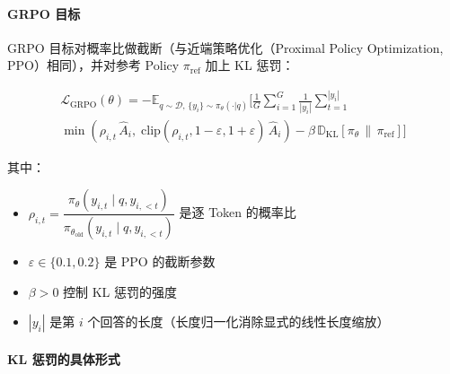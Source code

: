 \paragraph{GRPO 目标}
\label{grpo-objective}

GRPO 目标对概率比做截断（与近端策略优化（Proximal Policy Optimization, PPO）相同），并对参考 Policy $\pi_{\text{ref}}$ 加上 KL 惩罚：

\begin{multline}
\mathcal{L}_{\text{GRPO}}(\theta) = -\mathbb{E}_{q \sim \mathcal{D},\, \{y_i\} \sim \pi_\theta(\cdot|q)} \Bigg[ \frac{1}{G} \sum_{i=1}^{G} \frac{1}{|y_i|} \sum_{t=1}^{|y_i|} \\
\min\!\left( \rho_{i,t}\, \hat{A}_i,\; \text{clip}(\rho_{i,t}, 1{-}\varepsilon, 1{+}\varepsilon)\, \hat{A}_i \right) - \beta\, \mathbb{D}_{\mathrm{KL}}\!\left[\pi_\theta \,\|\, \pi_{\text{ref}}\right] \Bigg]
\label{eq:grpo_full}
\end{multline}

其中：

\begin{itemize}
  \item $\rho_{i,t} = \dfrac{\pi_\theta(y_{i,t} \mid q, y_{i,<t})}{\pi_{\theta_{\text{old}}}(y_{i,t} \mid q, y_{i,<t})}$ 是逐 Token 的概率比
  \item $\varepsilon \in \{0.1, 0.2\}$ 是 PPO 的截断参数
  \item $\beta > 0$ 控制 KL 惩罚的强度
  \item $|y_i|$ 是第 $i$ 个回答的长度（长度归一化消除显式的线性长度缩放）
\end{itemize}

\paragraph{KL 惩罚的具体形式}
\label{kl-penalty-formulation}

